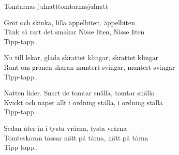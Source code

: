 \begin{song}{Tomtarnas julnatt}{tomtarnasjulnatt}
\begin{vers}
Gröt och skinka, lilla äppelbiten, äppelbiten\\
Tänk så rart det smakar Nisse liten, Nisse liten\\
Tipp-tapp..\\
\end{vers}
\begin{vers}
Nu till lekar, glada skrattet klingar, skrattet klingar\\
Runt om granen skaran muntert svingar, muntert svingar\\
Tipp-tapp..\\
\end{vers}
\begin{vers}
Natten lider. Snart de tomtar snälla, tomtar snälla\\
Kvickt och näpet allt i ordning ställa, i ordning ställa\\
Tipp-tapp..\\
\end{vers}
\begin{vers}
Sedan åter in i tysta vrårna, tysta vrårna\\
Tomteskaran tassar nätt på tårna, nätt på tårna\\
Tipp-tapp..\\
\end{vers}
\end{song}
